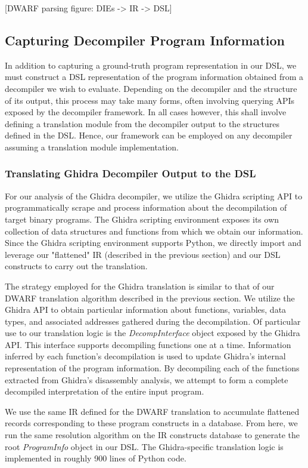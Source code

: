 \documentclass[conference]{IEEEtran}
\begin{document}
[DWARF parsing figure: DIEs -> IR -> DSL]

\subsection{Capturing Decompiler Program Information}

In addition to capturing a ground-truth program representation in our DSL, we must construct a DSL representation of the program information obtained from a decompiler we wish to evaluate. Depending on the decompiler and the structure of its output, this process may take many forms, often involving querying APIs exposed by the decompiler framework. In all cases however, this shall involve defining a translation module from the decompiler output to the structures defined in the DSL. Hence, our framework can be employed on any decompiler assuming a translation module implementation.

\subsubsection{Translating Ghidra Decompiler Output to the DSL}

For our analysis of the Ghidra decompiler, we utilize the Ghidra scripting API to programmatically scrape and process information about the decompilation of target binary programs. The Ghidra scripting environment exposes its own collection of data structures and functions from which we obtain our information. Since the Ghidra scripting environment supports Python, we directly import and leverage our "flattened" IR (described in the previous section) and our DSL constructs to carry out the translation.

The strategy employed for the Ghidra translation is similar to that of our DWARF translation algorithm described in the previous section. We utilize the Ghidra API to obtain particular information about functions, variables, data types, and associated addresses gathered during the decompilation. Of particular use to our translation logic is the \emph{DecompInterface} object exposed by the Ghidra API. This interface supports decompiling functions one at a time. Information inferred by each function's decompilation is used to update Ghidra's internal representation of the program information. By decompiling each of the functions extracted from Ghidra's disassembly analysis, we attempt to form a complete decompiled interpretation of the entire input program.

We use the same IR defined for the DWARF translation to accumulate flattened records corresponding to these program constructs in a database. From here, we run the same resolution algorithm on the IR constructs database to generate the root \emph{ProgramInfo} object in our DSL. The Ghidra-specific translation logic is implemented in roughly 900 lines of Python code.
\end{document}

